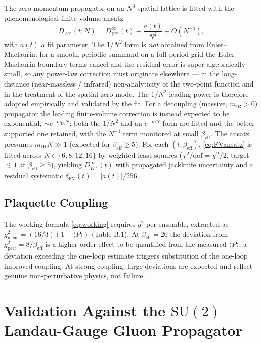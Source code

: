 \documentclass[11pt,a4paper]{article}
\theoremstyle{plain}
\theoremstyle{definition}
\theoremstyle{remark}
\newcommand{\SU}{\mathrm{SU}}
\newcommand{\DW}{D_{W^{\pm}}}
\newcommand{\be}{\beta_{\mathrm{eff}}}
\begin{document}
The zero-momentum propagator on an $N^3$ spatial lattice is fitted with the
phenomenological finite-volume ansatz
\begin{equation}
  \DW(t;N)=\DW^{\infty}(t)+\frac{a(t)}{N^2}+O(N^{-4}),
  \label{eq:FVansatz}
\end{equation}
with $a(t)$ a fit parameter. The $1/N^2$ form is \emph{not} obtained from
Euler--Maclaurin: for a smooth periodic summand on a full-period grid the
Euler--Maclaurin boundary terms cancel and the residual error is
super-algebraically small, so any power-law correction must originate
elsewhere --- in the long-distance (near-massless / infrared)
non-analyticity of the two-point function and in the treatment of the
spatial zero mode. The $1/N^2$ leading power is therefore adopted
empirically and validated by the fit. For a decoupling (massive,
$m_{\mathrm{IR}}>0$) propagator the leading finite-volume correction is
instead expected to be exponential, $\sim e^{-m_{\mathrm{IR}}N}$; both the
$1/N^2$ and an $e^{-mN}$ form are fitted and the better-supported one
retained, with the $N^{-4}$ term monitored at small $\be$. The ansatz
presumes $m_{\mathrm{IR}}N\gg1$ (expected for $\be\ge5$). For each
$(t,\be)$, \eqref{eq:FVansatz} is fitted across $N\in\{6,8,12,16\}$ by
weighted least squares ($\chi^2/\mathrm{dof}=\chi^2/2$, target $\lesssim1$
at $\be\ge5$), yielding $\DW^{\infty}(t)$ with propagated jackknife
uncertainty and a residual systematic $\delta_{\mathrm{FV}}(t)=|a(t)|/256$.

\subsection{Plaquette Coupling}
\label{ssec:coupling}

The working formula \eqref{eq:working} requires $g^2$ per ensemble,
extracted as $g^2_{\mathrm{meas}}=(16/3)(1-\langle P\rangle)$ (Table B.1). At
$\be=20$ the deviation from $g^2_{\mathrm{pert}}=8/\be$ is a higher-order
effect to be quantified from the measured $\langle P\rangle$; a deviation
exceeding the one-loop estimate triggers substitution of
the one-loop improved coupling. At strong coupling, large deviations are
expected and reflect genuine non-perturbative physics, not failure.

\section{Validation Against the $\SU(2)$ Landau-Gauge Gluon Propagator}
\label{sec:comparison}
\end{document}
